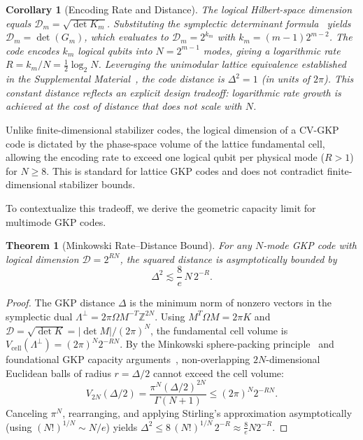 \documentclass[aps,prl,twocolumn,superscriptaddress]{revtex4-2}
\newtheorem{theorem}{Theorem}
\newtheorem{corollary}{Corollary}
\newcommand{\symp}{\Omega}
\begin{document}
\begin{corollary}[Encoding Rate and Distance]\label{cor:distance}
The logical Hilbert-space dimension equals $\mathcal{D}_m = \sqrt{\det K_m}$. Substituting the symplectic determinant formula~\cite{conrad2022} yields $\mathcal{D}_m = \det(G_m)$, which evaluates to $\mathcal{D}_m = 2^{k_m}$ with $k_m = (m-1)2^{m-2}$. The code encodes $k_m$ logical qubits into $N = 2^{m-1}$ modes, giving a logarithmic rate $R = k_m/N = \frac{1}{2}\log_2 N$. Leveraging the unimodular lattice equivalence established in the Supplemental Material~\cite{SM}, the code distance is $\Delta^2 = 1$ (in units of $2\pi$). This constant distance reflects an explicit design tradeoff: logarithmic rate growth is achieved at the cost of distance that does not scale with $N$.
\end{corollary}

Unlike finite-dimensional stabilizer codes, the logical dimension of a CV-GKP code is dictated by the phase-space volume of the lattice fundamental cell, allowing the encoding rate to exceed one logical qubit per physical mode ($R > 1$) for $N \ge 8$. This is standard for lattice GKP codes and does not contradict finite-dimensional stabilizer bounds.


To contextualize this tradeoff, we derive the geometric capacity limit for multimode GKP codes.

\begin{theorem}[Minkowski Rate--Distance Bound]\label{thm:minkowski}
For any $N$-mode GKP code with logical dimension $\mathcal{D} = 2^{RN}$, the squared distance is asymptotically bounded by
\begin{equation}
\Delta^2 \lesssim \frac{8}{e}\, N\, 2^{-R}.
\end{equation}
\end{theorem}

\begin{proof}
The GKP distance $\Delta$ is the minimum norm of nonzero vectors in the symplectic dual $\Lambda^\perp = 2\pi \symp M^{-T} \mathbb{Z}^{2N}$. Using $M^T \symp M = 2\pi K$ and $\mathcal{D} = \sqrt{\det K} = |\det M|/(2\pi)^N$, the fundamental cell volume is $V_{\mathrm{cell}}(\Lambda^\perp) = (2\pi)^N 2^{-RN}$. By the Minkowski sphere-packing principle~\cite{banaszczyk1993} and foundational GKP capacity arguments~\cite{harrington2001}, non-overlapping $2N$-dimensional Euclidean balls of radius $r = \Delta/2$ cannot exceed the cell volume:
\begin{equation}
V_{2N}(\Delta/2) = \frac{\pi^N (\Delta/2)^{2N}}{\Gamma(N+1)} \le (2\pi)^N 2^{-RN}.
\end{equation}
Canceling $\pi^N$, rearranging, and applying Stirling's approximation asymptotically (using $(N!)^{1/N} \sim N/e$) yields $\Delta^2 \le 8\,(N!)^{1/N}\,2^{-R} \approx \frac{8}{e} N 2^{-R}$.
\end{proof}
\end{document}
